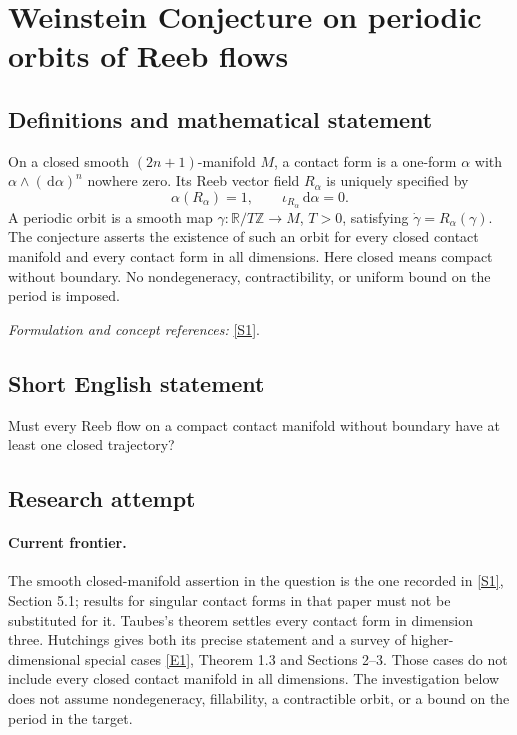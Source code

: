 \documentclass[11pt,a4paper]{article}
\newcommand{\Z}{\mathbb{Z}}
\newcommand{\R}{\mathbb{R}}
\newcommand{\dd}{\,\mathrm d}
\newcommand{\sref}[2]{\hyperlink{source:#1:#2}{[S#2]}}
\newcommand{\eref}[2]{\hyperlink{extra:#1:#2}{[E#2]}}
\newif\ifshowcatalogue
\newcommand{\cataloguescope}[1]{\ifshowcatalogue
 \paragraph{Exact scope in the supplied catalogue.}
 \begin{quote}\small #1\end{quote}\fi}
\numberwithin{equation}{section}
\begin{document}
\setcounter{section}{168}
\clearpage
\section{\texorpdfstring{Weinstein Conjecture on periodic orbits of Reeb flows}{Weinstein Conjecture on periodic orbits of Reeb flows}}\label{169}
\subsection{Definitions and mathematical statement}
On a closed smooth $(2n+1)$-manifold $M$, a contact form is a one-form $\alpha$ with $\alpha\wedge(\dd\alpha)^n$ nowhere zero. Its Reeb vector field $R_\alpha$ is uniquely specified by
\[
 \alpha(R_\alpha)=1,\qquad \iota_{R_\alpha}\dd\alpha=0.
\]
A periodic orbit is a smooth map $\gamma:\R/T\Z\to M$, $T>0$, satisfying $\dot\gamma=R_\alpha(\gamma)$. The conjecture asserts the existence of such an orbit for every closed contact manifold and every contact form in all dimensions. Here closed means compact without boundary. No nondegeneracy, contractibility, or uniform bound on the period is imposed.
\par\smallskip\textit{Formulation and concept references:} \sref{169}{1}.
\cataloguescope{Prove that every closed contact manifold admits a periodic orbit of the Reeb flow of any contact form, in all dimensions.}
\subsection{Short English statement}
Must every Reeb flow on a compact contact manifold without boundary have at least one closed trajectory?
\subsection{Research attempt}

\paragraph{Current frontier.}
The smooth closed-manifold assertion in the question is the one recorded in
\sref{169}{1}, Section 5.1; results for singular contact forms in that paper
must not be substituted for it. Taubes's theorem settles every contact form
in dimension three. Hutchings gives both its precise statement and a survey
of higher-dimensional special cases \eref{169}{1}, Theorem 1.3 and
Sections 2--3. Those cases do not include every closed contact manifold in
all dimensions. The investigation below does not assume nondegeneracy,
fillability, a contractible orbit, or a bound on the period in the target.
\end{document}
